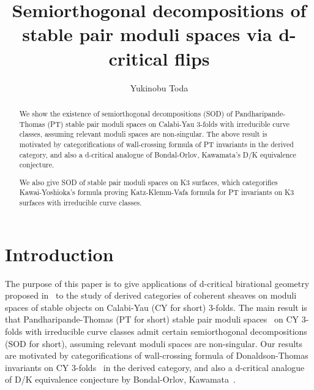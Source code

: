 \documentclass[11pt]{amsart}
\title[Semiorthogonal decomposition]{Semiorthogonal decompositions 
of stable pair moduli spaces via d-critical flips}
\date{}
\author{Yukinobu Toda}
\theoremstyle{plain}
\begin{document}
\begin{abstract}
We show the existence of 
semiorthogonal decompositions (SOD) of Pandharipande-Thomas (PT)
stable pair moduli spaces on Calabi-Yau 3-folds 
with irreducible curve classes, assuming
relevant moduli spaces are non-singular. 
The above result is motivated by
categorifications of 
wall-crossing formula of PT
invariants in the derived category, 
and also a d-critical analogue of Bondal-Orlov, Kawamata's 
D/K equivalence conjecture. 

We also give SOD of 
stable pair moduli spaces 
on K3 surfaces, which 
categorifies Kawai-Yoshioka's 
formula proving Katz-Klemm-Vafa formula for PT invariants 
on K3 surfaces with 
irreducible curve classes. 
\end{abstract}

\maketitle



\setcounter{tocdepth}{1}
\tableofcontents


\section{Introduction}
The purpose of this paper is
to give applications of d-critical birational geometry
proposed in~\cite{Toddbir}
to the study of derived categories of coherent sheaves
on moduli spaces of stable objects on 
Calabi-Yau (CY for short) 3-folds. 
The main result is that
Pandharipande-Thomas (PT for short) stable pair moduli spaces~\cite{PT} on 
CY 3-folds with irreducible curve classes
admit certain 
semiorthogonal decompositions (SOD for short), 
assuming relevant moduli spaces are non-singular. 
Our results are motivated by 
categorifications of wall-crossing formula of 
Donaldson-Thomas invariants on CY 3-folds~\cite{JS, K-S}
in the derived category, and 
also a 
d-critical analogue of D/K equivalence conjecture 
by Bondal-Orlov, Kawamata~\cite{B-O2, Ka1}. 
\end{document}

